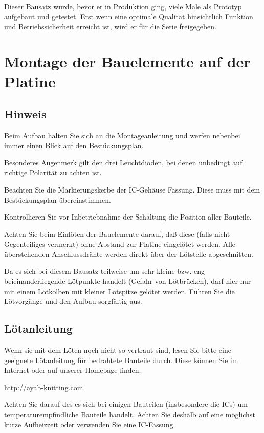 \documentclass[fleqn,10pt]{SelfArx} %
\begin{document}
Dieser Bausatz wurde, bevor er in Produktion ging, viele Male als Prototyp aufgebaut und getestet. Erst wenn eine optimale Qualität hinsichtlich Funktion und Betriebssicherheit erreicht ist, wird er für die Serie freigegeben.


\section{Montage der Bauelemente auf der Platine}

 \subsection*{Hinweis}

Beim Aufbau halten Sie sich an die Montageanleitung und werfen nebenbei immer einen Blick auf den Bestückungsplan.

Besonderes Augenmerk gilt den drei Leuchtdioden, bei denen unbedingt auf richtige Polarität zu achten ist.

Beachten Sie die Markierungskerbe der IC-Gehäuse Fassung. Diese muss mit dem Bestückungsplan übereinstimmen.

Kontrollieren Sie vor Inbetriebnahme der Schaltung die Position aller Bauteile.

Achten Sie beim Einlöten der Bauelemente darauf, daß diese (falls nicht Gegenteiliges vermerkt) ohne Abstand zur Platine eingelötet werden. Alle überstehenden Anschlussdrähte werden direkt über der Lötstelle abgeschnitten.

Da es sich bei diesem Bausatz teilweise um sehr kleine bzw. eng beieinanderliegende Lötpunkte handelt (Gefahr von Lötbrücken), darf hier nur mit einem Lötkolben mit kleiner Lötspitze gelötet werden. Führen Sie die Lötvorgänge und den Aufbau sorgfältig aus.

 \subsection*{Lötanleitung}

Wenn sie mit dem Löten noch nicht so vertraut sind, lesen Sie bitte eine geeignete Lötanleitung für bedrahtete Bauteile durch. Diese können Sie im Internet oder auf unserer Homepage finden.

\url{http://ayab-knitting.com}

Achten Sie darauf des es sich bei einigen Bauteilen (insbesondere die ICs) um temperaturempfindliche Bauteile handelt. Achten Sie deshalb auf eine möglichst kurze Aufheizzeit oder verwenden Sie eine IC-Fassung.
\end{document}
